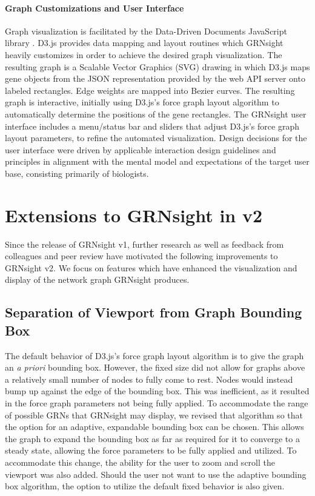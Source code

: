 \documentclass[sigconf,review]{acmart}
\begin{document}
\paragraph{Graph Customizations and User Interface} Graph visualization is facilitated by the Data-Driven Documents JavaScript library \cite{d3}. D3.js provides data mapping and layout routines which GRNsight heavily customizes in order to achieve the desired graph visualization. The resulting graph is a Scalable Vector Graphics (SVG) drawing in which D3.js maps gene objects from the JSON representation provided by the web API server onto labeled rectangles. Edge weights are mapped into Bezier curves. The resulting graph is interactive, initially using D3.js's force graph layout algorithm to automatically determine the positions of the gene rectangles. The GRNsight user interface includes a menu/status bar and sliders that adjust D3.js's force graph layout parameters, to refine the automated visualization. Design decisions for the user interface were driven by applicable interaction design guidelines and principles \cite{norman2013design,shneiderman2010designing,nielsen1994usability} in alignment with the mental model and expectations of the target user base, consisting primarily of biologists.

\section{Extensions to GRNsight in v2}
Since the release of GRNsight v1, further research as well as feedback from colleagues and peer review have motivated the following improvements to GRNsight v2. We focus on features which have enhanced the visualization and display of the network graph GRNsight produces.

\subsection{Separation of Viewport from Graph Bounding Box}
The default behavior of D3.js's force graph layout algorithm is to give the graph an \emph{a priori} bounding box. However, the fixed size did not allow for graphs above a relatively small number of nodes to fully come to rest. Nodes would instead bump up against the edge of the bounding box. This was inefficient, as it resulted in the force graph parameters not being fully applied. To accommodate the range of possible GRNs that GRNsight may display, we revised that algorithm so that the option for an adaptive, expandable bounding box can be chosen. This allows the graph to expand the bounding box as far as required for it to converge to a steady state, allowing the force parameters to be fully applied and utilized. To accommodate this change, the ability for the user to zoom and scroll the viewport was also added. Should the user not want to use the adaptive bounding box algorithm, the option to utilize the default fixed behavior is also given.
\end{document}
